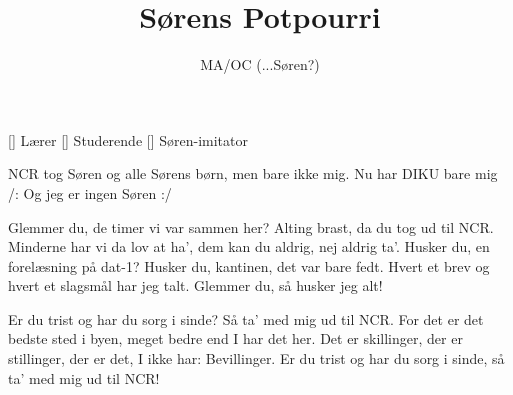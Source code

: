 \documentclass[a4paper,11pt]{article}
\title{Sørens Potpourri}
\author{MA/OC (...Søren?)}
\begin{document}
\maketitle

\begin{roles}
[] Lærer
[] Studerende
[] Søren-imitator
\end{roles}

\begin{song}
NCR tog Søren
og alle Sørens børn,
men bare ikke mig.
Nu har DIKU bare mig
/: Og jeg er ingen Søren :/

Glemmer du, de timer vi var sammen her?
Alting brast, da du tog ud til NCR.
Minderne har vi da lov at ha',
dem kan du aldrig, nej aldrig ta'.
Husker du, en forelæsning på dat-1?
Husker du, kantinen, det var bare fedt.
Hvert et brev og hvert et slagsmål har jeg talt.
Glemmer du, så husker jeg alt!

Er du trist og har du sorg i sinde?
Så ta' med mig ud til NCR.
For det er det bedste sted i byen,
meget bedre end I har det her.
Det er skillinger,
der er stillinger,
der er det, I ikke har: Bevillinger.
Er du trist og har du sorg i sinde,
så ta' med mig ud til NCR!
\end{song}
\end{document}

